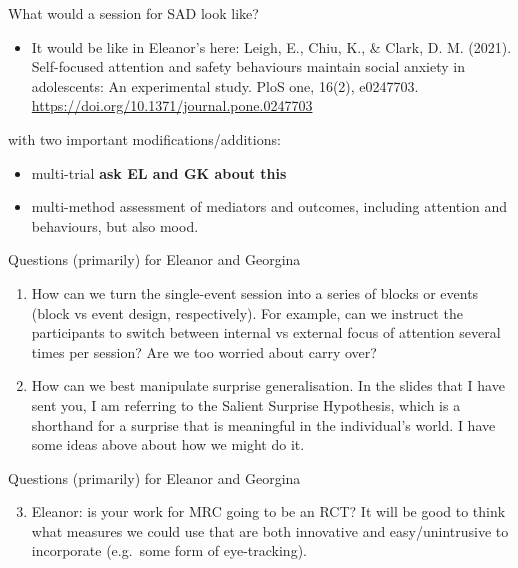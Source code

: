 \documentclass[
  ignorenonframetext,
]{beamer}
\providecommand{\tightlist}{%
  \setlength{\itemsep}{0pt}\setlength{\parskip}{0pt}}
\begin{document}
\begin{frame}{What would a session for SAD look like?}
\protect\hypertarget{what-would-a-session-for-sad-look-like}{}

\begin{itemize}
\tightlist
\item
  It would be like in Eleanor's here: Leigh, E., Chiu, K., \& Clark, D.
  M. (2021). Self-focused attention and safety behaviours maintain
  social anxiety in adolescents: An experimental study. PloS one, 16(2),
  e0247703. \url{https://doi.org/10.1371/journal.pone.0247703} 
\end{itemize}

with two important modifications/additions:

\begin{itemize}
\item
  multi-trial \textbf{ask EL and GK about this}
\item
  multi-method assessment of mediators and outcomes, including attention
  and behaviours, but also mood.
\end{itemize}

\end{frame}

\begin{frame}{Questions (primarily) for Eleanor and Georgina}
\protect\hypertarget{questions-primarily-for-eleanor-and-georgina}{}

\begin{enumerate}
\item
  How can we turn the single-event session into a series of blocks or
  events (block vs event design, respectively). For example, can we
  instruct the participants to switch between internal vs external focus
  of attention several times per session? Are we too worried about carry
  over?
\item
  How can we best manipulate surprise generalisation. In the slides that
  I have sent you, I am referring to the Salient Surprise Hypothesis,
  which is a shorthand for a surprise that is meaningful in the
  individual's world. I have some ideas above about how we might do it.
\end{enumerate}

\end{frame}

\begin{frame}{Questions (primarily) for Eleanor and Georgina}
\protect\hypertarget{questions-primarily-for-eleanor-and-georgina-1}{}

\begin{enumerate}
\setcounter{enumi}{2}
\tightlist
\item
  Eleanor: is your work for MRC going to be an RCT? It will be good to
  think what measures we could use that are both innovative and
  easy/unintrusive to incorporate (e.g.~some form of eye-tracking).
\end{enumerate}

\end{frame}
\end{document}
